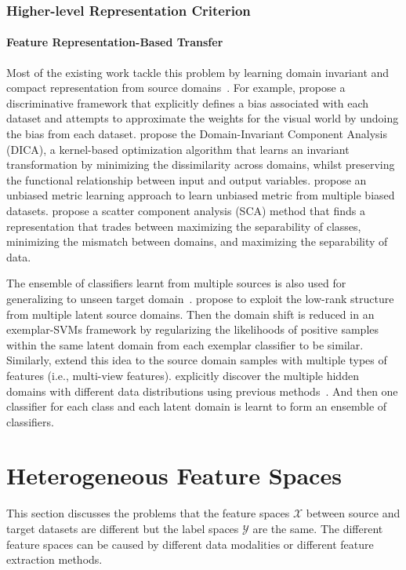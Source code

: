 \documentclass[prodmode]{acmsmall}  %
\begin{document}
\subsubsection{Higher-level Representation Criterion}
\paragraph{Feature Representation-Based Transfer} Most of the existing work tackle this problem by learning domain invariant and compact representation from source domains~\cite{Blanchard2011,Khosla2012,Muandet2013,Fang2013,Stamos2015,Ghifary2016}. For example,  propose a discriminative framework that explicitly defines a bias associated with each dataset and attempts to approximate the weights for the visual world by undoing the bias from each dataset.  propose the Domain-Invariant Component Analysis (DICA), a kernel-based optimization algorithm that learns an invariant transformation by minimizing the dissimilarity across domains, whilst preserving the functional relationship between input and output variables.  
 propose an unbiased metric learning approach to learn unbiased metric from multiple biased datasets.  propose a scatter component analysis (SCA) method that finds a representation that trades between maximizing the separability of classes, minimizing the mismatch between domains, and maximizing the separability of data. 

The ensemble of classifiers learnt from multiple sources is also used for generalizing to unseen target domain~\cite{Xu2014,Niu2015a,Niu2015}.  propose to exploit the low-rank structure from multiple latent source domains. Then the domain shift is reduced in an exemplar-SVMs framework by regularizing the likelihoods of positive samples within the same latent domain from each exemplar classifier to be similar. 
Similarly,  extend this idea to the source domain samples with multiple types of features (i.e., multi-view features).
 explicitly discover the multiple hidden domains with different data distributions using previous methods~\cite{Gong2013a}. And then one classifier for each class and each latent domain is learnt to form an ensemble of classifiers.

\section{Heterogeneous Feature Spaces}
\label{sec:HETEF}
This section discusses the problems that the feature spaces $\mathcal{X}$ between source and target datasets are different but the label spaces $\mathcal{Y}$ are the same. The different feature spaces can be caused by different data modalities or different feature extraction methods. 
\end{document}
